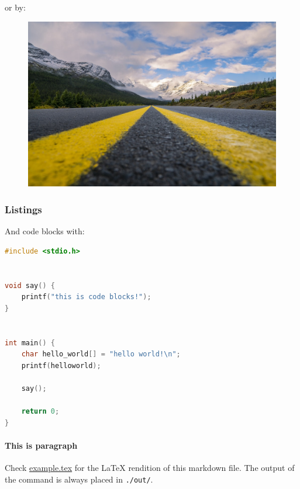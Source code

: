 \documentclass[12pt]{article}
\begin{document}
    or by:

    \begin{center}
        \begin{figure}[h]
            \includegraphics[width=\textwidth]{./sample_image.jpeg}
        \end{figure}
    \end{center}

    \subsubsection{Listings}

    And code blocks with:

\begin{lstlisting}[language=C]
#include <stdio.h>


void say() {
    printf("this is code blocks!");
}


int main() {
    char hello_world[] = "hello world!\n";
    printf(helloworld);

    say();

    return 0;
}
\end{lstlisting}

    \paragraph{This is paragraph}

    Check \href{./example.tex}{example.tex} for the LaTeX rendition of this markdown file. The output of the command is always placed in \texttt{./out/}.
\end{document}
